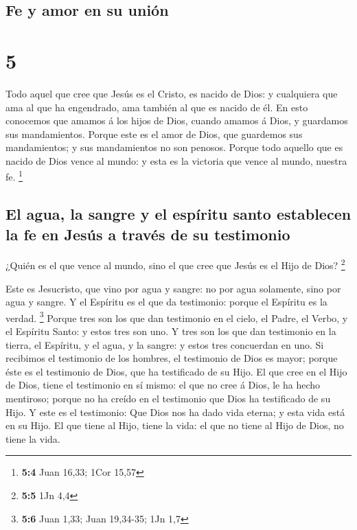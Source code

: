\hypertarget{fe-y-amor-en-su-uniuxf3n}{%
\subsection{Fe y amor en su unión}\label{fe-y-amor-en-su-uniuxf3n}}

\hypertarget{section-4}{%
\section{5}\label{section-4}}

 Todo aquel que cree que Jesús es el Cristo, es nacido de
Dios: y cualquiera que ama al que ha engendrado, ama también al que es
nacido de él.  En esto conocemos que amamos á los hijos de
Dios, cuando amamos á Dios, y guardamos sus mandamientos. 
Porque este es el amor de Dios, que guardemos sus mandamientos; y sus
mandamientos no son penosos.  Porque todo aquello que es
nacido de Dios vence al mundo: y esta es la victoria que vence al mundo,
nuestra fe. \footnote{\textbf{5:4} Juan 16,33; 1Cor 15,57}

\hypertarget{el-agua-la-sangre-y-el-espuxedritu-santo-establecen-la-fe-en-jesuxfas-a-travuxe9s-de-su-testimonio}{%
\subsection{El agua, la sangre y el espíritu santo establecen la fe en
Jesús a través de su
testimonio}\label{el-agua-la-sangre-y-el-espuxedritu-santo-establecen-la-fe-en-jesuxfas-a-travuxe9s-de-su-testimonio}}

 ¿Quién es el que vence al mundo, sino el que cree que
Jesús es el Hijo de Dios? \footnote{\textbf{5:5} 1Jn 4,4}

 Este es Jesucristo, que vino por agua y sangre: no por
agua solamente, sino por agua y sangre. Y el Espíritu es el que da
testimonio: porque el Espíritu es la verdad. \footnote{\textbf{5:6} Juan
  1,33; Juan 19,34-35; 1Jn 1,7}  Porque tres son los que
dan testimonio en el cielo, el Padre, el Verbo, y el Espíritu Santo: y
estos tres son uno.  Y tres son los que dan testimonio en
la tierra, el Espíritu, y el agua, y la sangre: y estos tres concuerdan
en uno.  Si recibimos el testimonio de los hombres, el
testimonio de Dios es mayor; porque éste es el testimonio de Dios, que
ha testificado de su Hijo.  El que cree en el Hijo de
Dios, tiene el testimonio en sí mismo: el que no cree á Dios, le ha
hecho mentiroso; porque no ha creído en el testimonio que Dios ha
testificado de su Hijo.  Y este es el testimonio: Que
Dios nos ha dado vida eterna; y esta vida está en su Hijo.
 El que tiene al Hijo, tiene la vida: el que no tiene al
Hijo de Dios, no tiene la vida.

